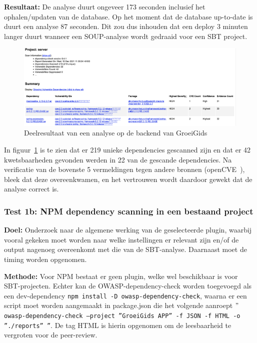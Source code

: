 \textbf{Resultaat:} De analyse duurt ongeveer 173 seconden inclusief het ophalen/updaten van de database. Op het moment dat de database up-to-date is duurt een analyse 87 seconden. Dit zou dus inhouden dat een deploy 3 minuten langer duurt wanneer een SOUP-analyse wordt gedraaid voor een SBT project.
\begin{figure}
    \myfloatalign
    \includegraphics[width=15cm]{gfx/report_analyse_test1a_SBT}
    \caption{Deelresultaat van een analyse op de backend van GroeiGids}
    \label{fig:SBTReport1A}
\end{figure}

In figuur~\ref{fig:SBTReport1A} is te zien dat er 219 unieke dependencies gescanned zijn en dat er 42 kwetsbaarheden gevonden werden in 22 van de gescande dependencies. Na verificatie van de bovenste 5 vermeldingen tegen andere bronnen (openCVE~\citep{openCve:z.d.}), bleek dat deze overeenkwamen, en het vertrouwen wordt daardoor gewekt dat de analyse correct is.

\subsubsection{Test 1b: NPM dependency scanning in een bestaand project}

\textbf{Doel:} Onderzoek naar de algemene werking van de geselecteerde plugin, waarbij vooral gekeken moet worden naar welke instellingen er relevant zijn en/of de output nagenoeg overeenkomt met die van de SBT-analyse. Daarnaast moet de timing worden opgenomen.

\textbf{Methode:} Voor NPM bestaat er geen plugin, welke wel beschikbaar is voor SBT-projecten. Echter kan de OWASP-dependency-check worden toegevoegd als een dev-dependency \texttt{npm install -D owasp-dependency-check}, waarna er een script moet worden aangemaakt in package.json die het volgende aanroept \texttt{$"$owasp-dependency-check --project ''GroeiGids APP'' -f JSON -f HTML -o ''./reports'' ''}. De tag HTML is hierin opgenomen om de leesbaarheid te vergroten voor de peer-review.

